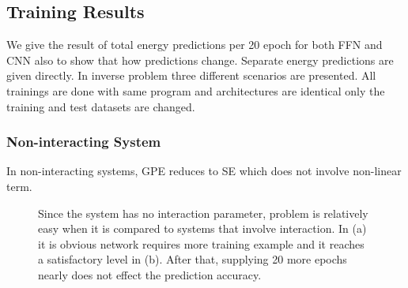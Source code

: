 \documentclass[a4paper,times,12pt]{article}
\begin{document}
\subsection{Training Results}

We give the result of total energy predictions per 20 epoch for both FFN and CNN also to show that how predictions change. Separate energy predictions are given directly. In inverse problem three different scenarios are presented. All trainings are done with same program and architectures are identical only the training and test datasets are changed. 






\subsubsection{Non-interacting System}

In non-interacting systems, GPE reduces to SE which does not involve non-linear term. 

\begin{figure}[H]
    \centering
    \begin{subfigure}[t]{0.45\textwidth}
        
		\label{fig:a}
    \end{subfigure}
    \begin{subfigure}[t]{0.45\textwidth}
        
		\label{fig:b}
    \end{subfigure}
    \begin{subfigure}[t]{0.45\textwidth}
        
		\label{fig:c}
    \end{subfigure}
    \begin{subfigure}[t]{0.45\textwidth}
        
		\label{fig:d}
    \end{subfigure}
    \caption{Since the system has no interaction parameter, problem is relatively easy when it is compared to systems that involve interaction. In (a) it is obvious network requires more training example and it reaches a satisfactory level in (b). After that, supplying 20 more epochs nearly does not effect the prediction accuracy.}
\label{fig:FFN-g-0}
\end{figure}
\end{document}
